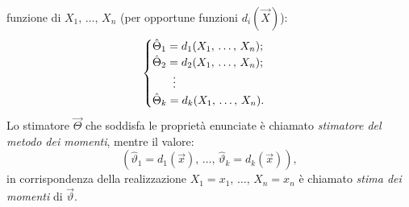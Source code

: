 \begin{defn}
            funzione di $X_1,\, \ldots,\, X_n$ (per opportune funzioni $d_i(\vec{X})$):
            \begin{equation*}
                \begin{cases}
                    \hat{\Theta}_1 = d_1(X_1,\, \ldots,\, X_{n}); \\
                    \hat{\Theta}_2 = d_2(X_1,\, \ldots,\, X_{n}); \\
                    \hspace{1.8em}\vdots \\
                    \hat{\Theta}_k = d_k(X_1,\, \ldots,\, X_{n}).
                \end{cases}
            \end{equation*}
            Lo stimatore $\vec{\Theta}$ che soddisfa le proprietà enunciate è chiamato 
            \emph{stimatore del metodo dei momenti}, mentre il valore: \[
                (\hat{\vartheta}_1 = d_1(\vec{x}),\, \ldots,\, \hat{\vartheta}_k = d_k(\vec{x}))
            ,\] in corrispondenza della realizzazione $X_1 = x_1,\, \ldots,\, X_n = x_n$ è chiamato 
            \emph{stima dei momenti} di $\vec{\vartheta}$.
        \end{defn}
